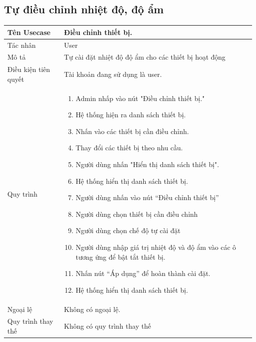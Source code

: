 \subsection{Tự điều chỉnh nhiệt độ, độ ẩm}
\begin{center}
	\begin{tabular}{|p{4cm}|p{10cm}|}
		\hline
		Tên Usecase & Điều chỉnh thiết bị.\\ \hline
		Tác nhân & User\\ \hline
		Mô tả &	Tự cài đặt nhiệt độ độ ẩm cho các thiết bị hoạt động
		\\ \hline
		Điều kiện tiên quyết & Tài khoản đang sử dụng là user. \\ \hline
		Quy trình & \begin{enumerate}
			\item  Admin nhấp vào nút "Điều chỉnh thiết bị."
			\item Hệ thống hiện ra danh sách thiết bị.
			\item  Nhấn vào các thiết bị cần điều chỉnh.
			\item Thay đổi các thiết bị theo nhu cầu.
			\item Người dùng nhấn "Hiển thị danh sách thiết bị".
			\item Hệ thống hiển thị danh sách thiết bị.
			\item Người dùng nhấn vào nút “Điều chỉnh thiết bị”
			\item Người dùng chọn thiết bị cần điều chỉnh
			\item Người dùng chọn chế độ tự cài đặt
			\item Người dùng nhập giá trị nhiệt độ và độ ẩm vào các ô tương ứng để bật tắt thiết bị.
			\item Nhấn nút “Áp dụng” để hoàn thành cài đặt.
			\item Hệ thống hiển thị danh sách thiết bị.
			
		\end{enumerate}\\ \hline
		Ngoại lệ & Không có ngoại lệ.\\ \hline
		Quy trình thay thế & Không có quy trình thay thế\\ \hline
		
	\end{tabular}
\end{center}

